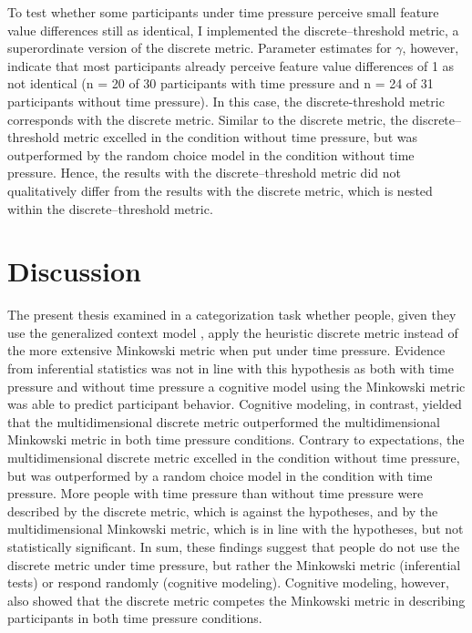 \documentclass[a4paper,man,natbib]{apa6}
\begin{document}
To test whether some participants under time pressure perceive small feature value differences still as identical, I implemented the discrete--threshold metric, a superordinate version of the discrete metric. Parameter estimates for $\gamma$, however, indicate that most participants already perceive feature value differences of 1 as not identical (n = 20 of 30 participants with time pressure and n = 24 of 31 participants without time pressure). In this case, the discrete-threshold metric corresponds with the discrete metric. Similar to the discrete metric, the discrete--threshold metric excelled in the condition without time pressure, but was outperformed by the random choice model in the condition without time pressure. 
Hence, the results with the discrete--threshold metric did not qualitatively differ from the results with the discrete metric, which is nested within the discrete--threshold metric.

\section{Discussion}
The present thesis examined in a categorization task whether people, given they use the generalized context model \citep{nosofsky1986attention}, apply the heuristic discrete metric instead of the more extensive Minkowski metric when put under time pressure. Evidence from inferential statistics was not in line with this hypothesis as both with time pressure and without time pressure a cognitive model using the Minkowski metric was able to predict participant behavior. Cognitive modeling, in contrast, yielded that the multidimensional discrete metric outperformed the multidimensional Minkowski metric in both time pressure conditions. Contrary to expectations, the multidimensional discrete metric excelled in the condition without time pressure, but was outperformed by a random choice model in the condition with time pressure. More people with time pressure than without time pressure were described by the discrete metric, which is against the hypotheses, and by the multidimensional Minkowski metric, which is in line with the hypotheses, but not statistically significant. In sum, these findings suggest that people do not use the discrete metric under time pressure, but rather the Minkowski metric (inferential tests) or respond randomly (cognitive modeling). Cognitive modeling, however, also showed that the discrete metric competes the Minkowski metric in describing participants in both time pressure conditions. 
\end{document}

